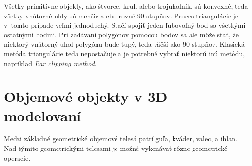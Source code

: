 Všetky primitívne objekty, ako štvorec, kruh alebo trojuholník, sú konvexné, teda všetky vnútorné uhly sú menšie alebo rovné 90 stupňov. Proces triangulácie je v~tomto prípade veľmi jednoduchý. Stačí spojiť jeden ľubovoľný bod so všetkými ostatnými bodmi. Pri zadávaní polygónov pomocou bodov sa ale môže stať, že niektorý vnútorný uhol polygónu bude tupý, teda väčší ako 90 stupňov. Klasická metóda triangulácie teda nepostačuje a je potrebné vybrať niektorú inú metódu, napríklad \textit{Ear clipping method}.















































\section{Objemové objekty v 3D modelovaní}
Medzi základné geometrické objemové telesá patrí guľa, kváder, valec, a ihlan. Nad týmito geometrickými telesami je možné vykonávať rôzne geometrické operácie.







